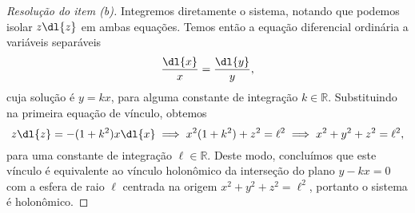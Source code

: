 \begin{proof}[Resolução do item (b)]
    Integremos diretamente o sistema, notando que podemos isolar \(z \dl{z}\) em ambas equações. Temos então a equação diferencial ordinária a variáveis separáveis
    \begin{equation*}
        \frac{\dl{x}}{x} = \frac{\dl{y}}{y},
    \end{equation*}
    cuja solução é \(y = kx\), para alguma constante de integração \(k \in \mathbb{R}\). Substituindo na primeira equação de vínculo, obtemos
    \begin{equation*}
        z \dl{z} = - (1 + k^2)x \dl{x} \implies x^2(1 + k^2) +  z^2 = \ell^2 \implies x^2 + y^2 + z^2 = \ell^2,
    \end{equation*}
    para uma constante de integração \(\ell \in \mathbb{R}\). Deste modo, concluímos que este vínculo é equivalente ao vínculo holonômico da interseção do plano \(y - kx = 0\) com a esfera de raio \(\ell\) centrada na origem \(x^2 + y^2 + z^2 = \ell^2\), portanto o sistema é holonômico.
\end{proof}
